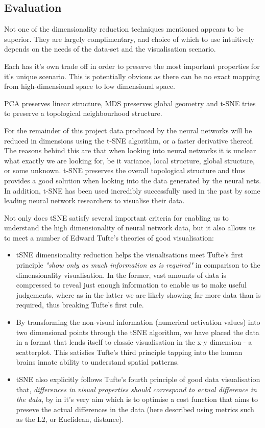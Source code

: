 \documentclass[a4paper,11pt,titlepage]{article}
\begin{document}
	\subsection{Evaluation}
	Not one of the dimensionality reduction techniques mentioned appears to be superior. They are largely complimentary, and choice of which to use intuitively depends on the needs of the data-set and the visualisation scenario. 
	\par 
	Each has it's own trade off in order to preserve the most important properties for it's unique scenario. This is potentially obvious as there can be no exact mapping from high-dimensional space to low dimensional space. 
		\par 
		PCA preserves linear structure, MDS preserves global geometry and t-SNE tries to preserve a topological neighbourhood structure.
		\par 
		For the remainder of this project data produced by the neural networks will be reduced in dimensions using the t-SNE algorithm, or a faster derivative thereof. The reasons behind this are that when looking into neural networks it is unclear what exactly we are looking for, be it variance, local structure, global structure, or some unknown. t-SNE preserves the overall topological structure and thus provides a good solution when looking into the data generated by the neural nets. In addition, t-SNE has been used incredibly successfully used in the past by some leading neural network researchers to visualise their data\cite{Maaten2008}.
		\par 
		Not only does tSNE satisfy several important criteria for enabling us to understand the high dimensionality of neural network data, but it also allows us to meet a number of Edward Tufte's theories of good visualisation:
		\begin{itemize}
			\item tSNE dimensionality reduction helps the visualisations meet Tufte's first principle \textit{"show only as much information as is required"} in comparison to the dimensionality visualisation. In the former, vast amounts of data is compressed to reveal just enough information to enable us to make useful judgements, where as in the latter we are likely showing far more data than is required, thus breaking Tufte's first rule.
			\item By transforming the non-visual information (numerical activation values) into two dimensional points through the tSNE algorithm, we have placed the data in a format that lends itself to classic visualisation in the x-y dimension - a scatterplot. This satisfies Tufte's third principle tapping into the human brains innate ability to understand spatial patterns.
			\item tSNE also explicitly follows Tufte's fourth principle of good data visualisation that, \textit{differences in visual properties should correspond to actual difference in the data}, by in it's very aim which is to optimise a cost function that aims to preseve the actual differences in the data (here described using metrics such as the L2, or Euclidean, distance).
		\end{itemize}
\end{document}
